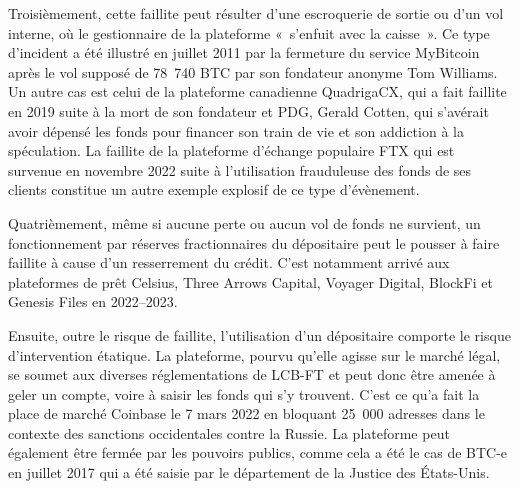 Troisièmement, cette faillite peut résulter d'une escroquerie de sortie ou d'un vol interne, où le gestionnaire de la plateforme «~s'enfuit avec la caisse~». Ce type d'incident a été illustré en juillet 2011 par la fermeture du service MyBitcoin après le vol supposé de 78~740 BTC par son fondateur anonyme Tom Williams. Un autre cas est celui de la plateforme canadienne QuadrigaCX, qui a fait faillite en 2019 suite à la mort de son fondateur et PDG, Gerald Cotten, qui s'avérait avoir dépensé les fonds pour financer son train de vie et son addiction à la spéculation. La faillite de la plateforme d'échange populaire FTX qui est survenue en novembre 2022 suite à l'utilisation frauduleuse des fonds de ses clients constitue un autre exemple explosif de ce type d'évènement.

Quatrièmement, même si aucune perte ou aucun vol de fonds ne survient, un fonctionnement par réserves fractionnaires du dépositaire peut le pousser à faire faillite à cause d'un resserrement du crédit. C'est notamment arrivé aux plateformes de prêt Celsius, Three Arrows Capital, Voyager Digital, BlockFi et Genesis Files en 2022--2023.

Ensuite, outre le risque de faillite, l'utilisation d'un dépositaire comporte le risque d'intervention étatique. La plateforme, pourvu qu'elle agisse sur le marché légal, se soumet aux diverses réglementations de LCB-FT et peut donc être amenée à geler un compte, voire à saisir les fonds qui s'y trouvent. C'est ce qu'a fait la place de marché Coinbase le 7 mars 2022 en bloquant 25~000 adresses dans le contexte des sanctions occidentales contre la Russie. La plateforme peut également être fermée par les pouvoirs publics, comme cela a été le cas de BTC-e en juillet 2017 qui a été saisie par le département de la Justice des États-Unis.

